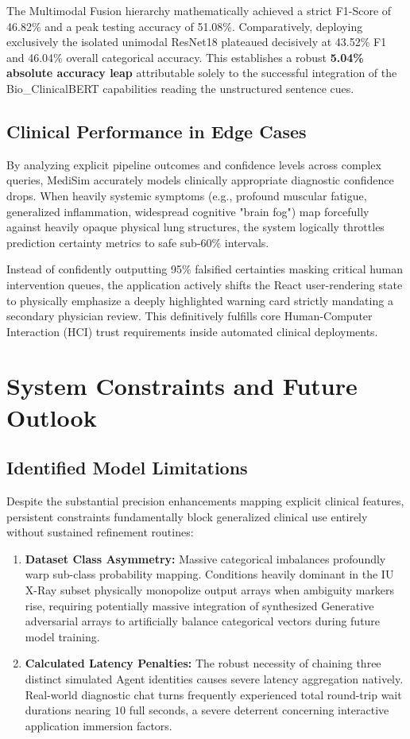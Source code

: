 \documentclass[11pt,a4paper]{article}
\begin{document}
The Multimodal Fusion hierarchy mathematically achieved a strict F1-Score of 46.82\% and a peak testing accuracy of 51.08\%. Comparatively, deploying exclusively the isolated unimodal ResNet18 plateaued decisively at 43.52\% F1 and 46.04\% overall categorical accuracy. This establishes a robust \textbf{5.04\% absolute accuracy leap} attributable solely to the successful integration of the Bio\_ClinicalBERT capabilities reading the unstructured sentence cues.

\subsection{Clinical Performance in Edge Cases}
By analyzing explicit pipeline outcomes and confidence levels across complex queries, MediSim accurately models clinically appropriate diagnostic confidence drops. When heavily systemic symptoms (e.g., profound muscular fatigue, generalized inflammation, widespread cognitive "brain fog") map forcefully against heavily opaque physical lung structures, the system logically throttles prediction certainty metrics to safe sub-60\% intervals. 

Instead of confidently outputting 95\% falsified certainties masking critical human intervention queues, the application actively shifts the React user-rendering state to physically emphasize a deeply highlighted warning card strictly mandating a secondary physician review. This definitively fulfills core Human-Computer Interaction (HCI) trust requirements inside automated clinical deployments.

\section{System Constraints and Future Outlook}

\subsection{Identified Model Limitations}
Despite the substantial precision enhancements mapping explicit clinical features, persistent constraints fundamentally block generalized clinical use entirely without sustained refinement routines:
\begin{enumerate}
    \item \textbf{Dataset Class Asymmetry:} Massive categorical imbalances profoundly warp sub-class probability mapping. Conditions heavily dominant in the IU X-Ray subset physically monopolize output arrays when ambiguity markers rise, requiring potentially massive integration of synthesized Generative adversarial arrays to artificially balance categorical vectors during future model training.
    \item \textbf{Calculated Latency Penalties:} The robust necessity of chaining three distinct simulated Agent identities causes severe latency aggregation natively. Real-world diagnostic chat turns frequently experienced total round-trip wait durations nearing $10$ full seconds, a severe deterrent concerning interactive application immersion factors. 
\end{enumerate}
\end{document}

